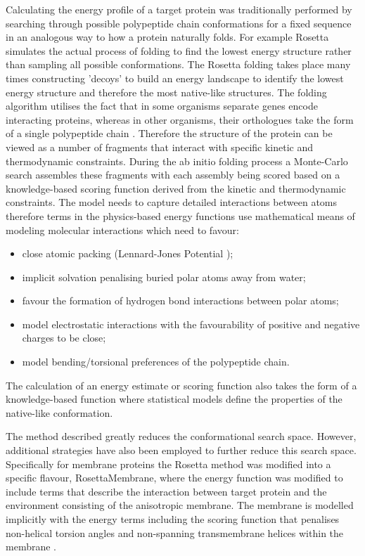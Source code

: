 Calculating the energy profile of a target protein was traditionally performed by searching through possible polypeptide chain conformations for a fixed sequence in an analogous way to how a protein naturally folds. For example Rosetta \cite{baker2001protein} simulates the actual process of folding to find the lowest energy structure rather than sampling all possible conformations.  The Rosetta folding takes place many times constructing 'decoys' to build an energy landscape to identify the lowest energy structure and therefore the most native-like structures. The folding algorithm utilises the fact that in some organisms separate genes encode interacting proteins, whereas in other organisms, their orthologues take the form of a single polypeptide chain \cite{hardin2002ab}. Therefore the structure of the protein can be viewed as a number of fragments that interact with specific kinetic and thermodynamic constraints.  During the ab initio folding process a Monte-Carlo search assembles these fragments with each assembly being scored based on a knowledge-based scoring function derived from the kinetic and thermodynamic constraints.  The model needs to capture detailed interactions between atoms therefore terms in the physics-based energy functions use mathematical means of modeling molecular interactions which need to favour:
\begin{itemize}
  \item close atomic packing (Lennard-Jones Potential \cite{jones1924determination});
  \item implicit solvation penalising buried polar atoms away from water;
  \item favour the formation of hydrogen bond interactions between polar atoms;
  \item model electrostatic interactions with the favourability of positive and negative charges to be close;
  \item model bending/torsional preferences of the polypeptide chain.
\end{itemize}
The calculation of an energy estimate or scoring function also takes the form of a knowledge-based function where statistical models define the properties of the native-like conformation. 

The method described greatly reduces the conformational search space.  However, additional strategies have also been employed to further reduce this search space.  Specifically for membrane proteins the Rosetta method was modified into a specific flavour, RosettaMembrane, where the energy function was modified to include terms that describe the interaction between target protein and the environment consisting of the anisotropic membrane. The membrane is modelled implicitly  with the energy terms including the scoring function that penalises non-helical torsion angles and non-spanning transmembrane helices within the membrane \cite{barth2007toward}.  



